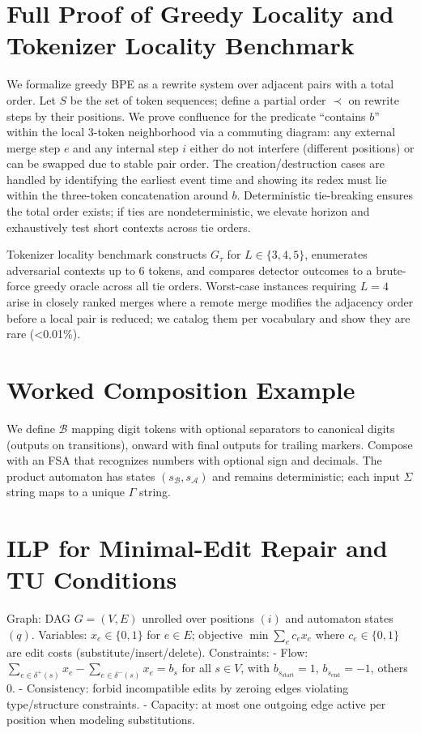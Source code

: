 \documentclass{article}
\begin{document}
\appendix
\section{Full Proof of Greedy Locality and Tokenizer Locality Benchmark}\label{app:locality}
We formalize greedy BPE as a rewrite system over adjacent pairs with a total order. Let $S$ be the set of token sequences; define a partial order $\prec$ on rewrite steps by their positions. We prove confluence for the predicate “contains $b$” within the local 3-token neighborhood via a commuting diagram: any external merge step $e$ and any internal step $i$ either do not interfere (different positions) or can be swapped due to stable pair order. The creation/destruction cases are handled by identifying the earliest event time and showing its redex must lie within the three-token concatenation around $b$. Deterministic tie-breaking ensures the total order exists; if ties are nondeterministic, we elevate horizon and exhaustively test short contexts across tie orders.

Tokenizer locality benchmark constructs $G_\tau$ for $L\in\{3,4,5\}$, enumerates adversarial contexts up to 6 tokens, and compares detector outcomes to a brute-force greedy oracle across all tie orders. Worst-case instances requiring $L=4$ arise in closely ranked merges where a remote merge modifies the adjacency order before a local pair is reduced; we catalog them per vocabulary and show they are rare (<0.01\%).

\section{Worked Composition Example}\label{app:worked}
We define $\mathcal{B}$ mapping digit tokens with optional separators to canonical digits (outputs on transitions), onward with final outputs for trailing markers. Compose with an FSA that recognizes numbers with optional sign and decimals. The product automaton has states $(s_{\mathcal{B}}, s_{\mathcal{A}})$ and remains deterministic; each input $\Sigma$ string maps to a unique $\Gamma$ string.

\section{ILP for Minimal-Edit Repair and TU Conditions}\label{app:ilp}
Graph: DAG $G=(V,E)$ unrolled over positions $(i)$ and automaton states $(q)$. Variables: $x_e\in\{0,1\}$ for $e\in E$; objective $\min \sum_{e} c_e x_e$ where $c_e\in\{0,1\}$ are edit costs (substitute/insert/delete). Constraints:
- Flow: $\sum_{e\in\delta^+(s)} x_e - \sum_{e\in\delta^-(s)} x_e = b_s$ for all $s\in V$, with $b_{s_{\mathrm{start}}}=1$, $b_{s_{\mathrm{end}}}=-1$, others 0.
- Consistency: forbid incompatible edits by zeroing edges violating type/structure constraints.
- Capacity: at most one outgoing edge active per position when modeling substitutions.
\end{document}

